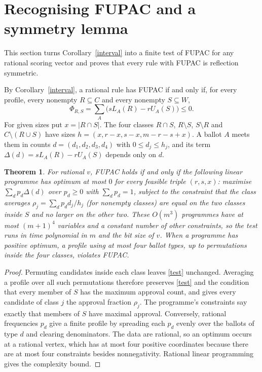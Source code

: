 \documentclass[11pt,a4paper]{article}
\newtheorem{theorem}{Theorem}
\theoremstyle{definition}
\theoremstyle{remark}
\begin{document}
\section{Recognising FUPAC and a symmetry lemma}\label{sec:recognition}
This section turns Corollary~\ref{interval} into a finite test of FUPAC for any rational scoring vector and proves that every rule with FUPAC is reflection symmetric.

By Corollary~\ref{interval}, a rational rule has FUPAC if and only if, for every profile, every nonempty $R\subseteq C$ and every nonempty $S\subseteq W$,
\begin{equation}
 \Phi_{R,S}=\sum_{A}\bigl(sL_A(R)-rU_A(S)\bigr)\le0 .\label{test}
\end{equation}
For given sizes put $x=|R\cap S|$. The four classes $R\cap S$, $R\setminus S$, $S\setminus R$ and $C\setminus(R\cup S)$ have sizes $h=(x,r-x,s-x,m-r-s+x)$. A ballot $A$ meets them in counts $d=(d_1,d_2,d_3,d_4)$ with $0\le d_j\le h_j$, and its term $\Delta(d)=sL_A(R)-rU_A(S)$ depends only on $d$.

\begin{theorem}\label{recognition}
For rational $v$, FUPAC holds if and only if the following linear programme has optimum at most $0$ for every feasible triple $(r,s,x)$: maximise $\sum_dp_d\Delta(d)$ over $p_d\ge0$ with $\sum_dp_d=1$, subject to the constraint that the class averages $\rho_j=\sum_dp_dd_j/h_j$ (for nonempty classes) are equal on the two classes inside $S$ and no larger on the other two. These $O(m^3)$ programmes have at most $(m+1)^4$ variables and a constant number of other constraints, so the test runs in time polynomial in $m$ and the bit size of $v$. When a programme has positive optimum, a profile using at most four ballot types, up to permutations inside the four classes, violates FUPAC.
\end{theorem}
\begin{proof}
Permuting candidates inside each class leaves \eqref{test} unchanged. Averaging a profile over all such permutations therefore preserves \eqref{test} and the condition that every member of $S$ has the maximum approval count, and gives every candidate of class $j$ the approval fraction $\rho_j$. The programme's constraints say exactly that members of $S$ have maximal approval. Conversely, rational frequencies $p_d$ give a finite profile by spreading each $p_d$ evenly over the ballots of type $d$ and clearing denominators. The data are rational, so an optimum occurs at a rational vertex, which has at most four positive coordinates because there are at most four constraints besides nonnegativity. Rational linear programming gives the complexity bound.
\end{proof}
\end{document}
